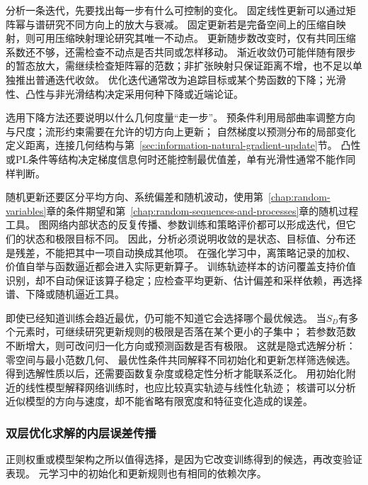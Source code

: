 分析一条迭代，先要找出每一步有什么可控制的变化。
固定线性更新可以通过矩阵幂与谱研究不同方向上的放大与衰减。
固定更新若是完备空间上的压缩自映射，则可用压缩映射理论研究其唯一不动点。
更新随步数改变时，仅有共同压缩系数还不够，还需检查不动点是否共同或怎样移动。
渐近收敛仍可能伴随有限步的暂态放大，需继续检查矩阵幂的范数；非扩张映射只保证距离不增，也不足以单独推出普通迭代收敛。
优化迭代通常改为追踪目标或某个势函数的下降；光滑性、凸性与非光滑结构决定采用何种下降或近端论证。

选用下降方法还要说明以什么几何度量“走一步”。
预条件利用局部曲率调整方向与尺度；流形约束需要在允许的切方向上更新；
自然梯度以预测分布的局部变化定义距离，连接几何结构与第~\ref{sec:information-natural-gradient-update}节。
凸性或PL条件等结构决定梯度信息何时还能控制最优值差，单有光滑性通常不能作同样判断。

随机更新还要区分平均方向、系统偏差和随机波动，使用第~\ref{chap:random-variables}章的条件期望和第~\ref{chap:random-sequences-and-processes}章的随机过程工具。
图网络内部状态的反复传播、参数训练和策略评价都可以形成迭代，但它们的状态和极限目标不同。
因此，分析必须说明收敛的是状态、目标值、分布还是残差，不能把其中一项自动换成其他项。
在强化学习中，离策略记录的加权、价值自举与函数逼近都会进入实际更新算子。
训练轨迹样本的访问覆盖支持价值识别，却不自动保证该算子稳定；应检查平均更新、估计偏差和采样依赖，再选择谱、下降或随机逼近工具。

即使已经知道训练会趋近最优，仍可能不知道它会选择哪个最优候选。
当$S_D$有多个元素时，可继续研究更新规则的极限是否落在某个更小的子集中；
若参数范数不断增大，则可改问归一化方向或预测函数是否有极限。
这就是隐式选解分析：零空间与最小范数几何、
最优性条件共同解释不同初始化和更新怎样筛选候选。
得到选解性质以后，还需要函数复杂度或稳定性分析才能联系泛化。
用初始化附近的线性模型解释网络训练时，也应比较真实轨迹与线性化轨迹；
核谱可以分析近似模型的方向与速度，却不能省略有限宽度和特征变化造成的误差。

\subsubsection{双层优化求解的内层误差传播}
\label{sec:future-analysis-nested-learning}

正则权重或模型架构之所以值得选择，是因为它改变训练得到的候选，再改变验证表现。
元学习中的初始化和更新规则也有相同的依赖次序。

